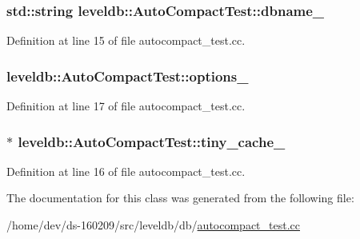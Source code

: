 \subsubsection[{dbname\+\_\+}]{\setlength{\rightskip}{0pt plus 5cm}std\+::string leveldb\+::\+Auto\+Compact\+Test\+::dbname\+\_\+}\label{classleveldb_1_1_auto_compact_test_a9caaa257e508397f94fbe646893b7b3b}


Definition at line 15 of file autocompact\+\_\+test.\+cc.

\hypertarget{classleveldb_1_1_auto_compact_test_ad7f1f35214065627e4cadd0468d22c21}{}
\subsubsection[{options\+\_\+}]{ leveldb\+::\+Auto\+Compact\+Test\+::options\+\_\+}\label{classleveldb_1_1_auto_compact_test_ad7f1f35214065627e4cadd0468d22c21}


Definition at line 17 of file autocompact\+\_\+test.\+cc.

\hypertarget{classleveldb_1_1_auto_compact_test_a189cb5733d861b7df8c3bf945180afe5}{}
\subsubsection[{tiny\+\_\+cache\+\_\+}]{$\ast$ leveldb\+::\+Auto\+Compact\+Test\+::tiny\+\_\+cache\+\_\+}\label{classleveldb_1_1_auto_compact_test_a189cb5733d861b7df8c3bf945180afe5}


Definition at line 16 of file autocompact\+\_\+test.\+cc.



The documentation for this class was generated from the following file\+:\begin{DoxyCompactItemize}
\item 
/home/dev/ds-\/160209/src/leveldb/db/\hyperlink{autocompact__test_8cc}{autocompact\+\_\+test.\+cc}\end{DoxyCompactItemize}
